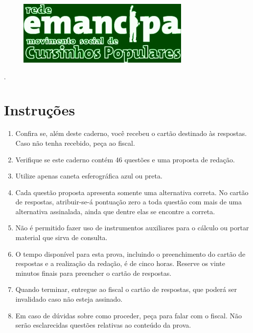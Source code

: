 \documentclass[10pt,a4paper]{article}
\begin{document}
\begin{figure}[!ht]
     \centering
     \includegraphics[scale=1.3]{logo_emancipa.jpg}
\end{figure}

\begin{center}
\end{center}

. \\

\section*{\LARGE{Instru\c{c}\~oes}}
	\begin{enumerate}
	\item  Confira se, al\'em deste caderno, voc\^e recebeu o cart\~ao destinado \`as respostas. Caso n\~ao tenha recebido, pe\c{c}a ao fiscal.
	\item Verifique se este caderno cont\'em 46 quest\~oes e uma proposta de reda\c{c}\~ao.
	\item Utilize apenas caneta esferogr\'afica azul ou preta.
	\item Cada quest\~ao proposta apresenta somente uma alternativa correta. No cart\~ao de respostas, atribuir-se-\'a pontua\c{c}\~ao zero a toda quest\~ao com mais de uma alternativa assinalada, ainda que dentre elas se encontre a correta.
	\item N\~ao \'e permitido fazer uso de instrumentos auxiliares para o c\'alculo ou portar material que sirva de consulta.
	\item O tempo dispon\'ivel para esta prova, incluindo o preenchimento do cart\~ao de respostas e a realiza\c{c}\~ao da reda\c{c}\~ao, \'e de cinco horas. Reserve os vinte minutos finais para preencher o cart\~ao de respostas.
	\item Quando terminar, entregue ao fiscal o cart\~ao de respostas, que poder\'a ser invalidado caso n\~ao esteja assinado.
	\item Em caso de d\'uvidas sobre como proceder, pe\c{c}a para falar com o fiscal. N\~ao ser\~ao esclarecidas quest\~oes relativas ao conte\'udo da prova.
	\end{enumerate}
\pagebreak
\end{document}
